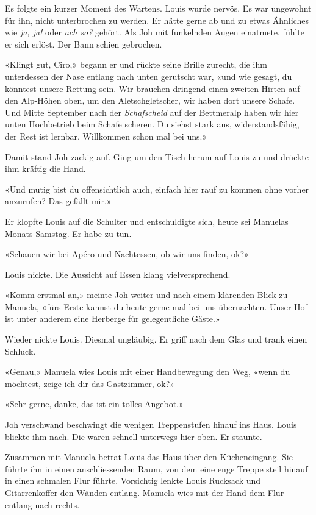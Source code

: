 Es folgte ein kurzer Moment des Wartens. Louis wurde nervös. Es war
ungewohnt für ihn, nicht unterbrochen zu werden. Er hätte gerne ab und
zu etwas Ähnliches wie \emph{ja, ja!} oder \emph{ach so?} gehört. Als
Joh mit funkelnden Augen einatmete, fühlte er sich erlöst. Der Bann
schien gebrochen.

«Klingt gut, Ciro,» begann er und rückte seine Brille zurecht, die ihm
unterdessen der Nase entlang nach unten gerutscht war, «und wie gesagt,
du könntest unsere Rettung sein. Wir brauchen dringend einen zweiten
Hirten auf den Alp-Höhen oben, um den Aletschgletscher, wir haben dort
unsere Schafe. Und Mitte September nach der \emph{Schafscheid} auf der
Bettmeralp haben wir hier unten Hochbetrieb beim Schafe scheren. Du
siehst stark aus, widerstandsfähig, der Rest ist lernbar. Willkommen
schon mal bei uns.»

Damit stand Joh zackig auf. Ging um den Tisch herum auf Louis zu und
drückte ihm kräftig die Hand.

«Und mutig bist du offensichtlich auch, einfach hier rauf zu kommen ohne
vorher anzurufen? Das gefällt mir.»

Er klopfte Louis auf die Schulter und entschuldigte sich, heute sei
Manuelas Monats-Samstag. Er habe zu tun.

«Schauen wir bei Apéro und Nachtessen, ob wir uns finden, ok?»

Louis nickte. Die Aussicht auf Essen klang vielversprechend.

«Komm erstmal an,» meinte Joh weiter und nach einem klärenden Blick zu
Manuela, «fürs Erste kannst du heute gerne mal bei uns übernachten.
Unser Hof ist unter anderem eine Herberge für gelegentliche Gäste.»

Wieder nickte Louis. Diesmal ungläubig. Er griff nach dem Glas und trank
einen Schluck.

«Genau,» Manuela wies Louis mit einer Handbewegung den Weg, «wenn du
möchtest, zeige ich dir das Gastzimmer, ok?»

«Sehr gerne, danke, das ist ein tolles Angebot.»

Joh verschwand beschwingt die wenigen Treppenstufen hinauf ins Haus.
Louis blickte ihm nach. Die waren schnell unterwegs hier oben. Er
staunte.

Zusammen mit Manuela betrat Louis das Haus über den Kücheneingang. Sie
führte ihn in einen anschliessenden Raum, von dem eine enge Treppe steil
hinauf in einen schmalen Flur führte. Vorsichtig lenkte Louis Rucksack
und Gitarrenkoffer den Wänden entlang. Manuela wies mit der Hand dem
Flur entlang nach rechts.

